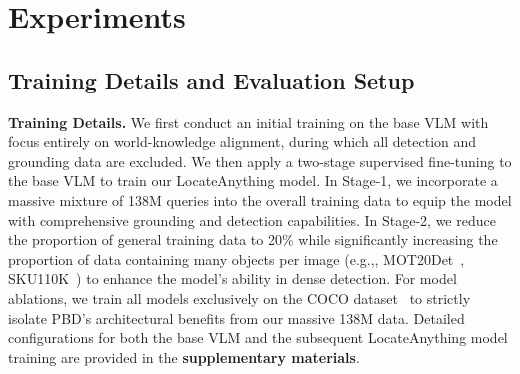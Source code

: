 \documentclass{llmxive}
\providecommand{\eg}{e.g.,\xspace}
\begin{document}
\section{Experiments}
\subsection{Training Details and Evaluation Setup}
\noindent\textbf{Training Details.}
We first conduct an initial training on the base VLM with focus entirely on world-knowledge alignment, during which all detection and grounding data are excluded. We then apply a two-stage supervised fine-tuning to the base VLM to train our LocateAnything model. In Stage-1, we incorporate a massive mixture of 138M queries into the overall training data to equip the model with comprehensive grounding and detection capabilities. In Stage-2, we reduce the proportion of general training data to 20\% while significantly increasing the proportion of data containing many objects per image (\eg, MOT20Det~\citep{dendorfer2020motchallengebenchmarksinglecameramultiple}, SKU110K~\citep{goldman2019precise}) to enhance the model's ability in dense detection. For model ablations, we train all models exclusively on the COCO dataset~\citep{lin2014microsoft} to strictly isolate PBD's architectural benefits from our massive 138M data. Detailed configurations for both the base VLM and the subsequent LocateAnything model training are provided in the \textbf{supplementary materials}.
\end{document}

